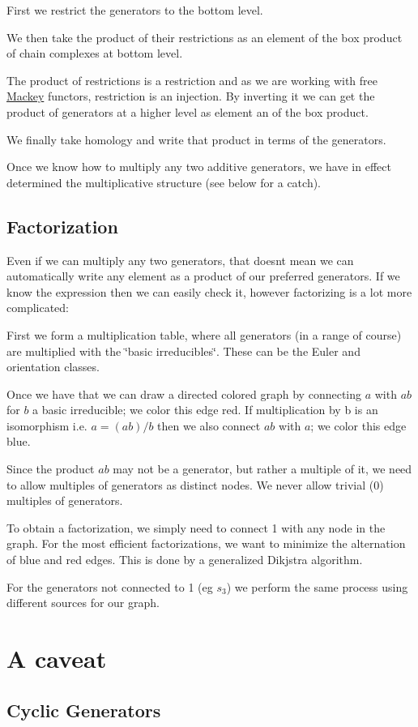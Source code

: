 \begin{DoxyItemize}
\item First we restrict the generators to the bottom level.
\item We then take the product of their restrictions as an element of the box product of chain complexes at bottom level.
\item The product of restrictions is a restriction and as we are working with free \hyperlink{namespaceMackey}{Mackey} functors, restriction is an injection. By inverting it we can get the product of generators at a higher level as element an of the box product.
\item We finally take homology and write that product in terms of the generators.
\end{DoxyItemize}

Once we know how to multiply any two additive generators, we have in effect determined the multiplicative structure (see below for a catch).\hypertarget{math_factor}{}\subsection{Factorization}\label{math_factor}
Even if we can multiply any two generators, that doesn\textquotesingle{}t mean we can automatically write any element as a product of our preferred generators. If we know the expression then we can easily check it, however factorizing is a lot more complicated\+:


\begin{DoxyItemize}
\item First we form a multiplication table, where all generators (in a range of course) are multiplied with the \char`\"{}basic irreducibles\char`\"{}. These can be the Euler and orientation classes.
\item Once we have that we can draw a directed colored graph by connecting $a$ with $ab$ for $b$ a basic irreducible; we color this edge red. If multiplication by b is an isomorphism i.\+e. $a=(ab)/b$ then we also connect $ab$ with $a$; we color this edge blue.
\item Since the product $ab$ may not be a generator, but rather a multiple of it, we need to allow multiples of generators as distinct nodes. We never allow trivial (0) multiples of generators.
\item To obtain a factorization, we simply need to connect 1 with any node in the graph. For the most efficient factorizations, we want to minimize the alternation of blue and red edges. This is done by a generalized Dikjstra algorithm.
\item For the generators not connected to 1 (eg $s_3$) we perform the same process using different sources for our graph.
\end{DoxyItemize}\hypertarget{math_caveat}{}\section{A caveat}\label{math_caveat}
\hypertarget{math_cyclic}{}\subsection{Cyclic Generators}\label{math_cyclic}

